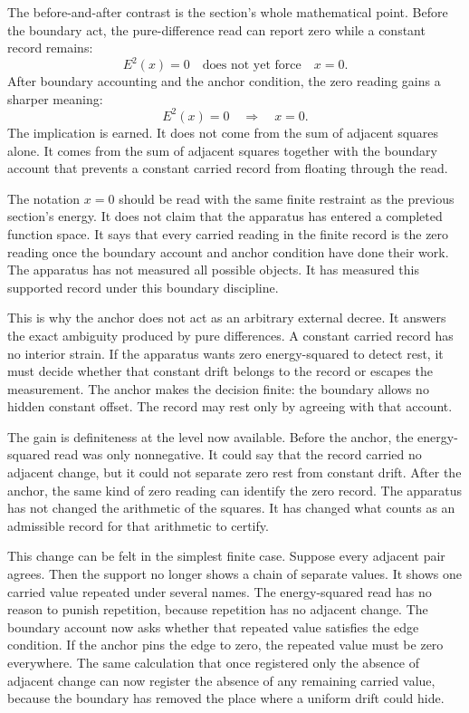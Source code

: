 The before-and-after contrast is the section's whole mathematical point. Before
the boundary act, the pure-difference read can report zero while a constant
record remains:
\[
  E^2(x)=0
  \quad\text{does not yet force}\quad
  x=0 .
\]
After boundary accounting and the anchor condition, the zero reading gains a
sharper meaning:
\[
  E^2(x)=0
  \quad\Longrightarrow\quad
  x=0 .
\]
The implication is earned. It does not come from the sum of adjacent squares
alone. It comes from the sum of adjacent squares together with the boundary
account that prevents a constant carried record from floating through the
read.

The notation \(x=0\) should be read with the same finite restraint as the
previous section's energy. It does not claim that the apparatus has entered a
completed function space. It says that every carried reading in the finite
record is the zero reading once the boundary account and anchor condition have
done their work. The apparatus has not measured all possible objects. It has
measured this supported record under this boundary discipline.

This is why the anchor does not act as an arbitrary external decree. It
answers the exact ambiguity produced by pure differences. A constant carried
record has no interior strain. If the apparatus wants zero energy-squared to
detect rest, it must decide whether that constant drift belongs to the record
or escapes the measurement. The anchor makes the decision finite: the boundary
allows no hidden constant offset. The record may rest only by agreeing with
that account.

The gain is definiteness at the level now available. Before the anchor, the
energy-squared read was only nonnegative. It could say that the record carried
no adjacent change, but it could not separate zero rest from constant drift.
After the anchor, the same kind of zero reading can identify the zero record.
The apparatus has not changed the arithmetic of the squares. It has changed
what counts as an admissible record for that arithmetic to certify.

This change can be felt in the simplest finite case. Suppose every adjacent
pair agrees. Then the support no longer shows a chain of separate values. It
shows one carried value repeated under several names. The energy-squared read
has no reason to punish repetition, because repetition has no adjacent change.
The boundary account now asks whether that repeated value satisfies the edge
condition. If the anchor pins the edge to zero, the repeated value must be
zero everywhere. The same calculation that once registered only the absence of
adjacent change can now register the absence of any remaining carried value,
because the boundary has removed the place where a uniform drift could hide.

